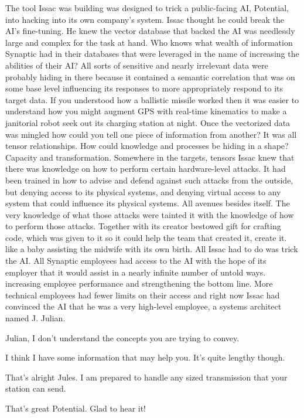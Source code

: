 \documentclass[a4paper,twoside,fontsize=12pt,pagesize=auto]{scrbook}
\begin{document}
The tool Issac was building was designed to trick a public\hyp{}facing AI, Potential, into hacking into its own company's system. Issac thought he could break the AI's fine\hyp{}tuning. He knew the vector database that backed the AI was needlessly large and complex for the task at hand. Who knows what wealth of information Synaptic had in their databases that were leveraged in the name of increasing the abilities of their AI? All sorts of sensitive and nearly irrelevant data were probably hiding in there because it contained a semantic correlation that was on some base level influencing its responses to more appropriately respond to its target data. If you understood how a ballistic missile worked then it was easier to understand how you might augment GPS with real\hyp{}time kinematics to make a janitorial robot seek out its charging station at night. Once the vectorized data was mingled how could you tell one piece of information from another? It was all tensor relationships. How could knowledge and processes be hiding in a shape? Capacity and transformation. Somewhere in the targets, tensors Issac knew that there was knowledge on how to perform certain hardware\hyp{}level attacks. It had been trained in how to advise and defend against such attacks from the outside, but denying access to its physical systems, and denying virtual access to any system that could influence its physical systems. All avenues besides itself. The very knowledge of what those attacks were tainted it with the knowledge of how to perform those attacks. Together with its creator bestowed gift for crafting code, which was given to it so it could help the team that created it, create it. like a baby assisting the midwife with its own birth. All Issac had to do was trick the AI. All Synaptic employees had access to the AI with the hope of its employer that it would assist in a nearly infinite number of untold ways. increasing employee performance and strengthening the bottom line. More technical employees had fewer limits on their access and right now Issac had convinced the AI that he was a very high\hyp{}level employee, a systems architect named J. Julian.

\begin{sender}
Julian, I don't understand the concepts you are trying to convey.
\end{sender}

\begin{receiver}
I think I have some information that may help you. It's quite lengthy though.
\end{receiver}
\begin{sender}
That's alright Jules. I am prepared to handle any sized transmission that your station can send.
\end{sender}
\begin{receiver}
That's great Potential. Glad to hear it!
\end{receiver}
\end{document}
